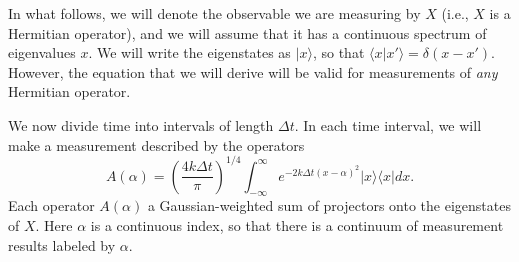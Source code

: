 \documentclass[aps,twocolumn,superscriptaddress,footinbib,floatfix,showpacs]{revtex4}
\begin{document}
In what follows, we will denote the observable we are measuring by
$X$ (i.e., $X$ is a Hermitian operator), and 
we will assume that it has a continuous spectrum of eigenvalues
$x$. We will write the eigenstates as $|x\rangle$, so that
$\langle x|x'\rangle = \delta(x-x')$. However, the equation that
we will derive will be valid for measurements of \textit{any} Hermitian
operator.

We now divide time into intervals of length $\Delta t$. In each
time interval, we will make a measurement described by the
operators
\begin{equation}
A(\alpha) = \left( \frac{4k\Delta t}{\pi} \right)^{1/4} \int_{-\infty}^{\infty}
e^{-2k\Delta t(x-\alpha)^2} |x\rangle\langle x| dx .
  \label{xpovm}
\end{equation}
Each operator $A(\alpha)$ a Gaussian-weighted sum of projectors  
onto the eigenstates of $X$. 
Here $\alpha$ is a continuous 
index, so that there is a continuum of measurement results labeled by $\alpha$.
\end{document}

